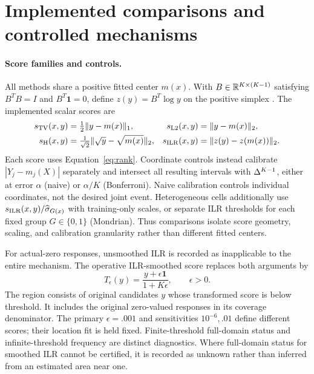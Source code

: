 \section{Implemented comparisons and controlled mechanisms}
\label{sec:methods}
\paragraph{Score families and controls.}
All methods share a positive fitted center $m(x)$. With $B\in\mathbb{R}^{K\times(K-1)}$ satisfying $B^TB=I$ and $B^T\mathbf1=0$, define $z(y)=B^T\log y$ on the positive simplex \citep{egozcue2003ilr}. The implemented scalar scores are
\begin{align}
 s_{\rm TV}(x,y)&=\tfrac12\|y-m(x)\|_1,&
 s_{\rm L2}(x,y)&=\|y-m(x)\|_2,\\
 s_{\rm H}(x,y)&=\tfrac1{\sqrt2}\|\sqrt y-\sqrt{m(x)}\|_2,&
 s_{\rm ILR}(x,y)&=\|z(y)-z(m(x))\|_2.
 \label{eq:scores}
\end{align}
Each score uses Equation~\eqref{eq:rank}. Coordinate controls instead calibrate $|Y_j-m_j(X)|$ separately and intersect all resulting intervals with $\Delta^{K-1}$, either at error $\alpha$ (naive) or $\alpha/K$ (Bonferroni). Naive calibration controls individual coordinates, not the desired joint event. Heterogeneous cells additionally use $s_{\rm ILR}(x,y)/\widehat\sigma_{G(x)}$ with training-only scales, or separate ILR thresholds for each fixed group $G\in\{0,1\}$ (Mondrian). Thus comparisons isolate score geometry, scaling, and calibration granularity rather than different fitted centers.

For actual-zero responses, unsmoothed ILR is recorded as inapplicable to the entire mechanism. The operative ILR-smoothed score replaces both arguments by
\begin{equation}
 T_\epsilon(y)=\frac{y+\epsilon\mathbf1}{1+K\epsilon},\qquad \epsilon>0.
 \label{eq:smoothing}
\end{equation}
The region consists of original candidates $y$ whose transformed score is below threshold. It includes the original zero-valued responses in its coverage denominator. The primary $\epsilon=.001$ and sensitivities $10^{-6},.01$ define different scores; their location fit is held fixed. Finite-threshold full-domain status and infinite-threshold frequency are distinct diagnostics. Where full-domain status for smoothed ILR cannot be certified, it is recorded as unknown rather than inferred from an estimated area near one.

